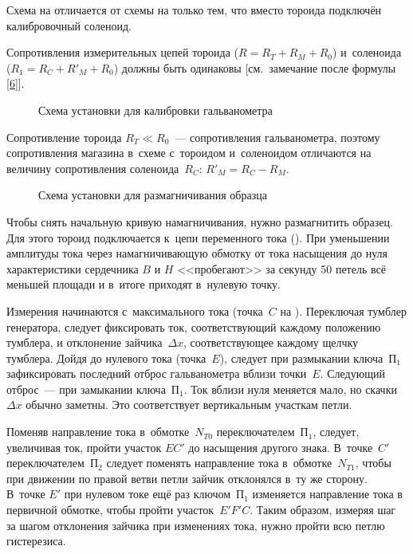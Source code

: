 Схема на  отличается от схемы на  только тем, что вместо тороида подключён калибровочный соленоид.

Сопротивления измерительных цепей тороида ($R=R_T+ R_M + R_0$) и~соленоида ($R_1=R_C+R'_M+R_0$) должны быть одинаковы
[см.~замечание после формулы \eqref{6}].

\begin{figure}
	\caption{Схема установки для калибровки гальванометра}
\end{figure}

Сопротивление тороида $R_T\ll R_0$~--- сопротивления гальванометра, поэтому сопротивления магазина в~схеме с~тороидом
и~соленоидом отличаются на величину сопротивления соленоида~$R_C$: $R'_M = R_C - R_M$.

\begin{wrapfigure}{r}{0.4\textwidth}
	\caption{Схема установки для размагничивания образца}
\end{wrapfigure}

Чтобы снять начальную кривую намагничивания, нужно размагнитить образец. Для этого тороид подключается к~цепи
переменного тока (). При уменьшении амплитуды тока через намагничивающую обмотку от тока насыщения до нуля
характеристики сердечника $B$ и $H$ <<пробегают>> за секунду 50 петель всё меньшей площади и в~итоге приходят в~нулевую
точку.


Измерения начинаются с~максимального тока (точка~$C$ на ). Переключая тумблер генератора,
следует фиксировать ток, соответствующий каждому положению тумблера, и отклонение зайчика~$\Delta x$, соответствующее
каждому щелчку тумблера. Дойдя до нулевого тока
(точка~$E$), следует при размыкании ключа~$П_1$ зафиксировать последний отброс гальванометра вблизи точки~$E$. Следующий
отброс~--- при замыкании ключа~$П_1$. Ток вблизи нуля меняется мало, но скачки~$\Delta x$ обычно заметны. Это соответствует
вертикальным участкам петли.

Поменяв направление тока в~обмотке~$N_{T0}$ переключателем~$П_1$, следует, увеличивая ток, пройти участок $EC'$ до
насыщения другого знака. В~точке~$C'$ переключателем~$П_2$ следует поменять направление тока в~обмотке~$N_{T1}$, чтобы при
движении по правой ветви петли зайчик отклонялся в~ту же сторону. В~точке $E'$ при нулевом токе ещё раз ключом~$П_1$
изменяется направление тока в первичной обмотке, чтобы пройти участок~$E'F'C$. Таким образом, измеряя шаг за шагом
отклонения зайчика при изменениях тока, нужно пройти всю петлю гистерезиса.

